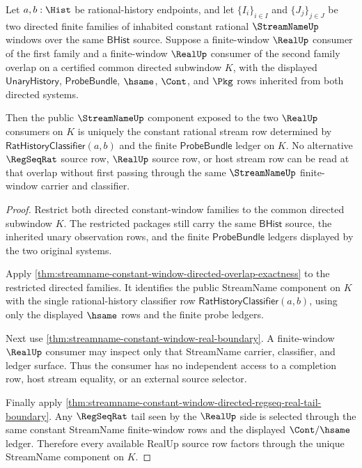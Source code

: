 \begin{theorem}
\label{thm:streamname-constant-window-directed-realup-source-uniqueness}
Let $a,b:\Hist$ be rational-history endpoints, and let
$\{I_i\}_{i\in I}$ and $\{J_j\}_{j\in J}$ be two directed finite families of
inhabited constant rational $\StreamNameUp$ windows over the same
$\mathsf{BHist}$ source. Suppose a finite-window $\RealUp$ consumer of the
first family and a finite-window $\RealUp$ consumer of the second family overlap
on a certified common directed subwindow $K$, with the displayed
$\mathsf{UnaryHistory}$, $\mathsf{ProbeBundle}$, $\hsame$, $\Cont$, and $\Pkg$
rows inherited from both directed systems.

Then the public $\StreamNameUp$ component exposed to the two $\RealUp$
consumers on $K$ is uniquely the constant rational stream row determined by
$\mathsf{RatHistoryClassifier}(a,b)$ and the finite $\mathsf{ProbeBundle}$
ledger on $K$. No alternative $\RegSeqRat$ source row, $\RealUp$ source row, or
host stream row can be read at that overlap without first passing through the
same $\StreamNameUp$ finite-window carrier and classifier.
\end{theorem}
\begin{proof}
Restrict both directed constant-window families to the common directed
subwindow $K$. The restricted packages still carry the same
$\mathsf{BHist}$ source, the inherited unary observation rows, and the finite
$\mathsf{ProbeBundle}$ ledgers displayed by the two original systems.

Apply
\autoref{thm:streamname-constant-window-directed-overlap-exactness} to the
restricted directed families. It identifies the public StreamName component on
$K$ with the single rational-history classifier row
$\mathsf{RatHistoryClassifier}(a,b)$, using only the displayed $\hsame$ rows
and the finite probe ledgers.

Next use \autoref{thm:streamname-constant-window-real-boundary}. A
finite-window $\RealUp$ consumer may inspect only that StreamName carrier,
classifier, and ledger surface. Thus the consumer has no independent access to
a completion row, host stream equality, or an external source selector.

Finally apply
\autoref{thm:streamname-constant-window-directed-regseq-real-tail-boundary}.
Any $\RegSeqRat$ tail seen by the $\RealUp$ side is selected through the same
constant StreamName finite-window rows and the displayed $\Cont/\hsame$ ledger.
Therefore every available RealUp source row factors through the unique
StreamName component on $K$.
\end{proof}

